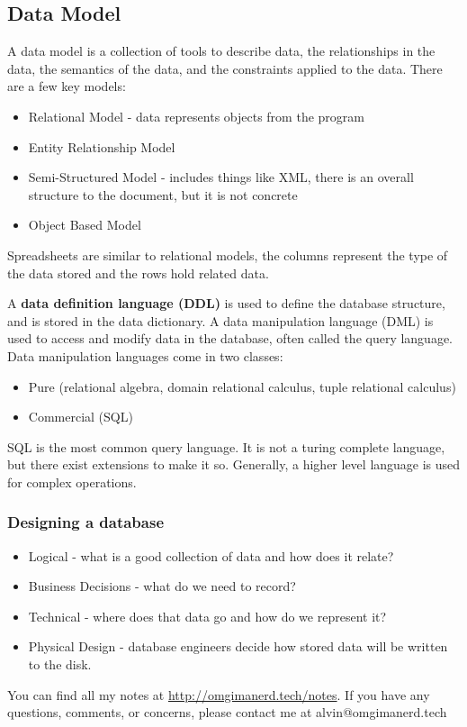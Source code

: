 \documentclass{math}
\begin{document}
\subsection*{Data Model}
A data model is a collection of tools to describe data, the relationships in the
data, the semantics of the data, and the constraints applied to the data. There
are a few key models:
\begin{itemize}
  \item Relational Model - data represents objects from the program
  \item Entity Relationship Model
  \item Semi-Structured Model - includes things like XML, there is an overall
    structure to the document, but it is not concrete
  \item Object Based Model
\end{itemize}
Spreadsheets are similar to relational models, the columns represent the type
of the data stored and the rows hold related data. \par
A \textbf{data definition language (DDL)} is used to define the database
structure, and is stored in the data dictionary. A data manipulation language
(DML) is used to access and modify data in the database, often called the query
language. Data manipulation languages come in two classes:
\begin{itemize}
  \item Pure (relational algebra, domain relational calculus, tuple relational
    calculus)
  \item Commercial (SQL)
\end{itemize}
SQL is the most common query language. It is not a turing complete language, but
there exist extensions to make it so. Generally, a higher level language is used
for complex operations.

\subsubsection*{Designing a database}
\begin{itemize}
  \item Logical - what is a good collection of data and how does it relate?
  \item Business Decisions - what do we need to record?
  \item Technical - where does that data go and how do we represent it?
  \item Physical Design - database engineers decide how stored data will be
    written to the disk.
\end{itemize}

\begin{center}
  You can find all my notes at \url{http://omgimanerd.tech/notes}. If you have
  any questions, comments, or concerns, please contact me at
  alvin@omgimanerd.tech
\end{center}
\end{document}

